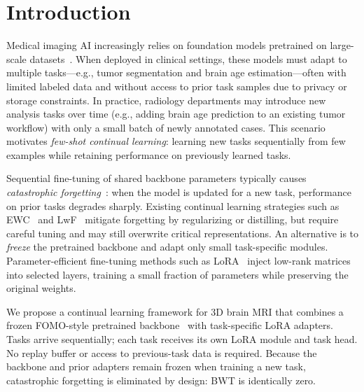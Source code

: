 \section{Introduction}
\label{sec:intro}

Medical imaging AI increasingly relies on foundation models pretrained on large-scale datasets~\cite{fomo2025,baseline}. When deployed in clinical settings, these models must adapt to multiple tasks---e.g., tumor segmentation and brain age estimation---often with limited labeled data and without access to prior task samples due to privacy or storage constraints. In practice, radiology departments may introduce new analysis tasks over time (e.g., adding brain age prediction to an existing tumor workflow) with only a small batch of newly annotated cases. This scenario motivates \emph{few-shot continual learning}: learning new tasks sequentially from few examples while retaining performance on previously learned tasks.

Sequential fine-tuning of shared backbone parameters typically causes \emph{catastrophic forgetting}~\cite{kirkpatrick2017,mccloskey1989catastrophic}: when the model is updated for a new task, performance on prior tasks degrades sharply. Existing continual learning strategies such as EWC~\cite{kirkpatrick2017} and LwF~\cite{li2017lwf} mitigate forgetting by regularizing or distilling, but require careful tuning and may still overwrite critical representations. An alternative is to \emph{freeze} the pretrained backbone and adapt only small task-specific modules. Parameter-efficient fine-tuning methods such as LoRA~\cite{hu2022lora, hu2024computational} inject low-rank matrices into selected layers, training a small fraction of parameters while preserving the original weights.

We propose a continual learning framework for 3D brain MRI that combines a frozen FOMO-style pretrained backbone~\cite{fomo2025} with task-specific LoRA adapters. Tasks arrive sequentially; each task receives its own LoRA module and task head. No replay buffer or access to previous-task data is required. Because the backbone and prior adapters remain frozen when training a new task, catastrophic forgetting is eliminated by design: BWT is identically zero.

